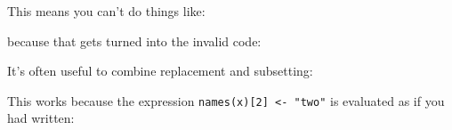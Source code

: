 \begin{Shaded}
\begin{Highlighting}[]
\NormalTok{, }\NormalTok{)}
\end{Highlighting}
\end{Shaded}

This means you can't do things like:

\begin{Shaded}
\begin{Highlighting}[]
\NormalTok{(}\NormalTok{(}\NormalTok{), }\NormalTok{) <-}\StringTok{ }
\end{Highlighting}
\end{Shaded}

because that gets turned into the invalid code:

\begin{Shaded}
\begin{Highlighting}[]
\NormalTok{(}\NormalTok{) <-}\NormalTok{(}\NormalTok{(}\NormalTok{), }\NormalTok{, }\NormalTok{)}
\end{Highlighting}
\end{Shaded}

It's often useful to combine replacement and subsetting:

\begin{Shaded}
\begin{Highlighting}[]
\StringTok{ }\NormalTok{(} \NormalTok{, } \NormalTok{, } \NormalTok{)}
\NormalTok{(x)[}\NormalTok{] <-}
\end{Highlighting}
\end{Shaded}

This works because the expression
\texttt{names(x){[}2{]} \textless{}- "two"} is evaluated as if you had
written:

\begin{Shaded}
\begin{Highlighting}[]
 \NormalTok{<-}\StringTok{ }
\NormalTok{[}\NormalTok{] <-}
\end{Highlighting}
\end{Shaded}

